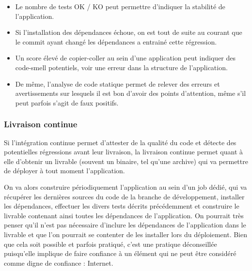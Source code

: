 \begin{itemize}
	\setlength\itemsep{0em}
	\item Le nombre de tests OK / KO peut permettre d'indiquer la stabilité de l'application.
	\item Si l'installation des dépendances échoue, on est tout de suite au courant que le commit ayant changé les dépendances a entrainé cette régression.
	\item Un score élevé de copier-coller au sein d'une application peut indiquer des \gls{code-smell} potentiels, voir une erreur dans la structure de l'application.
	\item De même, l'analyse de code statique permet de relever des erreurs et avertissements sur lesquels il est bon d'avoir des points d'attention, même s'il peut parfois s'agit de faux positifs.
\end{itemize}

\subsubsection{Livraison continue}

Si l'intégration continue permet d'attester de la qualité du code et détecte des potentielles régressions avant leur livraison, la livraison continue permet quant à elle d'obtenir un livrable (souvent un binaire, tel qu'une archive) qui va permettre de déployer à tout moment l'application. 

On va alors construire périodiquement l'application au sein d'un job dédié, qui va récupérer les dernières sources du code de la branche de développement, installer les dépendances, effectuer les divers tests décrits précédemment et construire le livrable contenant ainsi toutes les dépendances de l'application. On pourrait très penser qu'il n'est pas nécessaire d'inclure les dépendances de l'application dans le livrable et que l'on pourrait se contenter de les installer lors du déploiement. Bien que cela soit possible et parfois pratiqué, c'est une pratique déconseillée puisqu'elle implique de faire confiance à un élément qui ne peut être considéré comme digne de confiance : Internet. 

